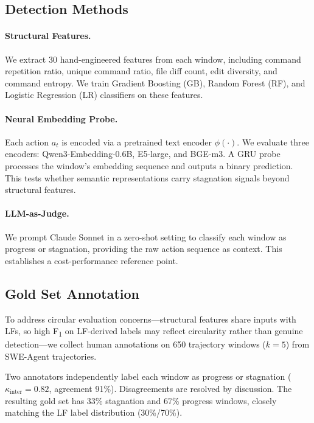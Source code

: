 \documentclass[11pt,a4paper]{article}
\newcommand{\fone}{F\textsubscript{1}}
\begin{document}
\subsection{Detection Methods}

\paragraph{Structural Features.}
We extract 30 hand-engineered features from each window, including command repetition ratio, unique command ratio, file diff count, edit diversity, and command entropy. We train Gradient Boosting (GB), Random Forest (RF), and Logistic Regression (LR) classifiers on these features.

\paragraph{Neural Embedding Probe.}
Each action $a_t$ is encoded via a pretrained text encoder $\phi(\cdot)$. We evaluate three encoders: Qwen3-Embedding-0.6B, E5-large, and BGE-m3. A GRU probe processes the window's embedding sequence and outputs a binary prediction. This tests whether semantic representations carry stagnation signals beyond structural features.

\paragraph{LLM-as-Judge.}
We prompt Claude Sonnet in a zero-shot setting to classify each window as progress or stagnation, providing the raw action sequence as context. This establishes a cost-performance reference point.

\subsection{Gold Set Annotation}
\label{sec:gold}

To address circular evaluation concerns---structural features share inputs with LFs, so high \fone{} on LF-derived labels may reflect circularity rather than genuine detection---we collect human annotations on 650 trajectory windows ($k{=}5$) from SWE-Agent trajectories.

Two annotators independently label each window as progress or stagnation ($\kappa_{\text{inter}}{=}0.82$, agreement 91\%). Disagreements are resolved by discussion. The resulting gold set has 33\% stagnation and 67\% progress windows, closely matching the LF label distribution (30\%/70\%).
\end{document}
